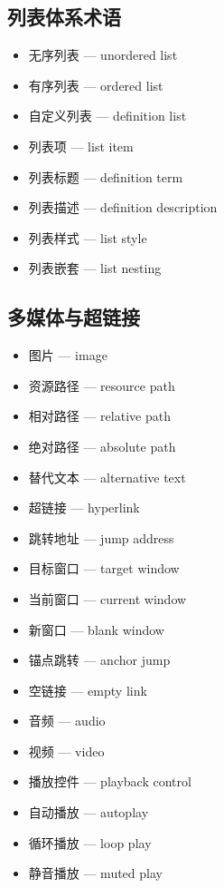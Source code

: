 \subsection{列表体系术语}
\begin{itemize}
\item 无序列表 — unordered list
\item 有序列表 — ordered list
\item 自定义列表 — definition list
\item 列表项 — list item
\item 列表标题 — definition term
\item 列表描述 — definition description
\item 列表样式 — list style
\item 列表嵌套 — list nesting
\end{itemize}

\subsection{多媒体与超链接}
\begin{itemize}
\item 图片 — image
\item 资源路径 — resource path
\item 相对路径 — relative path
\item 绝对路径 — absolute path
\item 替代文本 — alternative text
\item 超链接 — hyperlink
\item 跳转地址 — jump address
\item 目标窗口 — target window
\item 当前窗口 — current window
\item 新窗口 — blank window
\item 锚点跳转 — anchor jump
\item 空链接 — empty link
\item 音频 — audio
\item 视频 — video
\item 播放控件 — playback control
\item 自动播放 — autoplay
\item 循环播放 — loop play
\item 静音播放 — muted play
\end{itemize}

